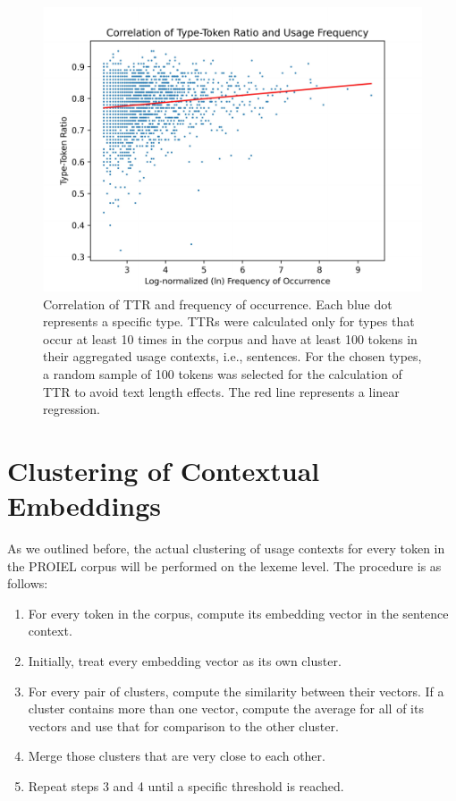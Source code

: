 \documentclass[oneside]{book}
\begin{document}
\begin{figure}[ht]
	\includegraphics[width=\linewidth]{ttr_vs_freq.pdf}
	\caption{Correlation of \gls{TTR} and frequency of occurrence. Each blue dot represents a specific type. \gls{TTR}s were calculated only for types that occur at least 10 times in the corpus and have at least 100 tokens in their aggregated usage contexts, i.e., sentences. For the chosen types, a random sample of 100 tokens was selected for the calculation of \gls{TTR} to avoid text length effects. The red line represents a linear regression.}
	\label{figure:ttr_vs_frequency}
\end{figure}

\section{Clustering of Contextual Embeddings}
As we outlined before, the actual clustering of usage contexts for every token in the PROIEL corpus will be performed on the lexeme level. The procedure is as follows:
\begin{enumerate}
	\item For every token in the corpus, compute its embedding vector in the sentence context.
	\item Initially, treat every embedding vector as its own cluster.
	\item For every pair of clusters, compute the similarity between their vectors. If a cluster contains more than one vector, compute the average for all of its vectors and use that for comparison to the other cluster.
	\item Merge those clusters that are very close to each other.
	\item Repeat steps 3 and 4 until a specific threshold is reached.
\end{enumerate}
\end{document}
